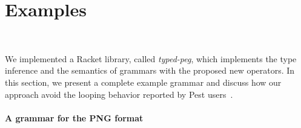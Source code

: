 \documentclass[sigplan,screen]{acmart}
\theoremstyle{definition}
\begin{document}
\section{Examples}~\label{sec:examples}

We implemented a Racket library, called \emph{typed-peg},
which implements the type inference and the semantics of grammars with the proposed new
operators. In this section, we present a complete example grammar and discuss how
our approach avoid the looping behavior reported by Pest users~\cite{PESTBUG}.

%
%
\paragraph{A grammar for the PNG format}
\end{document}
